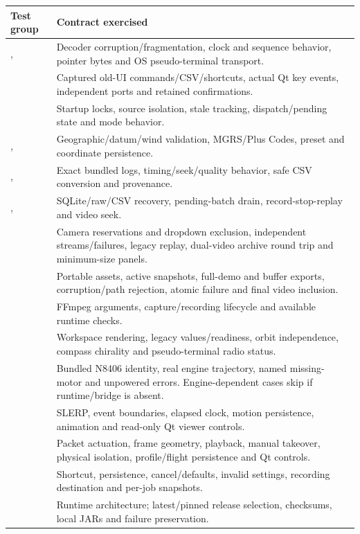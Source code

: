 \begin{longtable}{@{}L{.32\linewidth}L{.61\linewidth}@{}}
\toprule Test group & Contract exercised \\\midrule\endhead
{},  & Decoder corruption/fragmentation, clock and sequence behavior, pointer bytes and OS pseudo-terminal transport. \\
 & Captured old-UI commands/CSV/shortcuts, actual Qt key events, independent ports and retained confirmations. \\
 & Startup locks, source isolation, stale tracking, dispatch/pending state and mode behavior. \\
,  & Geographic/datum/wind validation, MGRS/Plus Codes, preset and coordinate persistence. \\
,  & Exact bundled logs, timing/seek/quality behavior, safe CSV conversion and provenance. \\
,  & SQLite/raw/CSV recovery, pending-batch drain, record-stop-replay and video seek. \\
 & Camera reservations and dropdown exclusion, independent streams/failures, legacy replay, dual-video archive round trip and minimum-size panels. \\
 & Portable assets, active snapshots, full-demo and buffer exports, corruption/path rejection, atomic failure and final video inclusion. \\
 & FFmpeg arguments, capture/recording lifecycle and available runtime checks. \\
 & Workspace rendering, legacy values/readiness, orbit independence, compass chirality and pseudo-terminal radio status. \\
 & Bundled N8406 identity, real engine trajectory, named missing-motor and unpowered errors. Engine-dependent cases skip if runtime/bridge is absent. \\
 & SLERP, event boundaries, elapsed clock, motion persistence, animation and read-only Qt viewer controls. \\
 & Packet actuation, frame geometry, playback, manual takeover, physical isolation, profile/flight persistence and Qt controls. \\
 & Shortcut, persistence, cancel/defaults, invalid settings, recording destination and per-job snapshots. \\
 & Runtime architecture; latest/pinned release selection, checksums, local JARs and failure preservation. \\
\bottomrule
\end{longtable}

